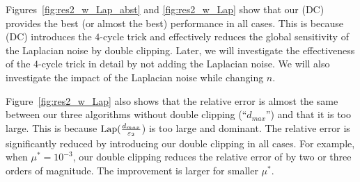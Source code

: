 Figures~\ref{fig:res2_w_Lap_abst} and \ref{fig:res2_w_Lap} show that our \AlgTwo{} (DC) 
provides the best (or almost the best) performance in all cases. 
This is because \AlgTwo{} (DC) introduces the $4$-cycle trick 
and effectively reduces the global sensitivity of the Laplacian noise by double clipping. 
Later, we will 
investigate 
the effectiveness of the $4$-cycle trick in detail 
by not adding the Laplacian noise. 
We will also investigate 
the impact of the Laplacian noise 
while changing $n$. 

Figure~\ref{fig:res2_w_Lap} also shows that 
the relative error is almost the same between our three algorithms without double clipping (``$d_{max}$'') and that it is too large. 
This is because $\textrm{Lap}(\frac{d_{max}}{\varepsilon_2}$) is too large and dominant. 
The relative error is significantly reduced by introducing our double clipping in all cases. 
For example, when $\mu^* = 10^{-3}$, our double clipping reduces the relative error of \AlgTwo{} by two or three orders of magnitude. 
The improvement is larger for smaller $\mu^*$. 

